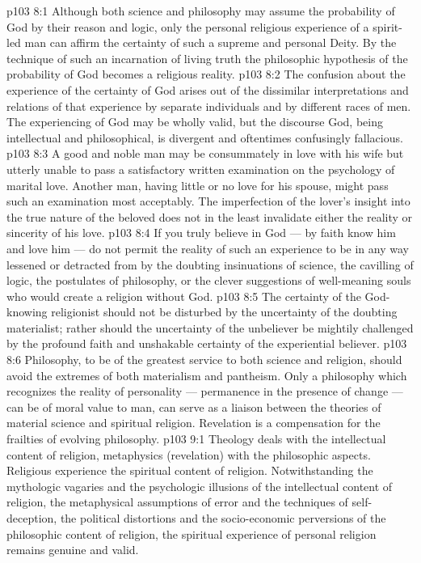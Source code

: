 \vs p103 8:1 Although both science and philosophy may assume the probability of God by their reason and logic, only the personal religious experience of a spirit\hyp{}led man can affirm the certainty of such a supreme and personal Deity. By the technique of such an incarnation of living truth the philosophic hypothesis of the probability of God becomes a religious reality.
\vs p103 8:2 The confusion about the experience of the certainty of God arises out of the dissimilar interpretations and relations of that experience by separate individuals and by different races of men. The experiencing of God may be wholly valid, but the discourse  God, being intellectual and philosophical, is divergent and oftentimes confusingly fallacious.
\vs p103 8:3 A good and noble man may be consummately in love with his wife but utterly unable to pass a satisfactory written examination on the psychology of marital love. Another man, having little or no love for his spouse, might pass such an examination most acceptably. The imperfection of the lover’s insight into the true nature of the beloved does not in the least invalidate either the reality or sincerity of his love.
\vs p103 8:4 \pc If you truly believe in God --- by faith know him and love him --- do not permit the reality of such an experience to be in any way lessened or detracted from by the doubting insinuations of science, the cavilling of logic, the postulates of philosophy, or the clever suggestions of well\hyp{}meaning souls who would create a religion without God.
\vs p103 8:5 The certainty of the God\hyp{}knowing religionist should not be disturbed by the uncertainty of the doubting materialist; rather should the uncertainty of the unbeliever be mightily challenged by the profound faith and unshakable certainty of the experiential believer.
\vs p103 8:6 \pc Philosophy, to be of the greatest service to both science and religion, should avoid the extremes of both materialism and pantheism. Only a philosophy which recognizes the reality of personality --- permanence in the presence of change --- can be of moral value to man, can serve as a liaison between the theories of material science and spiritual religion. Revelation is a compensation for the frailties of evolving philosophy.
\vs p103 9:1 Theology deals with the intellectual content of religion, metaphysics (revelation) with the philosophic aspects. Religious experience  the spiritual content of religion. Notwithstanding the mythologic vagaries and the psychologic illusions of the intellectual content of religion, the metaphysical assumptions of error and the techniques of self\hyp{}deception, the political distortions and the socio\hyp{}economic perversions of the philosophic content of religion, the spiritual experience of personal religion remains genuine and valid.
